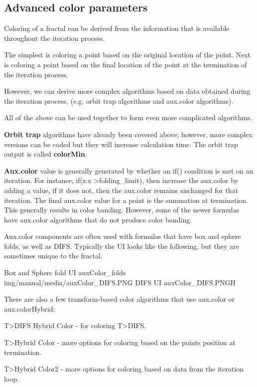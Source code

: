 \subsection{Advanced color parameters}\label{materials-advanced-color-parameters}

Coloring of a fractal can be derived from the information that is available throughout the iteration process.

The simplest is coloring a point based on the original location of the point.
Next is coloring a point based on the final location of the point at the termination of the iteration process.

However, we can derive more complex algorithms based on data obtained during the iteration process, (e.g. orbit trap algorithms and aux.color algorithms).

All of the above can be used together to form even more complicated algorithms.

\textbf{Orbit trap} algorithms have already been covered above; however, more complex versions can be coded but they will increase calculation time. The orbit trap output is called \textbf{colorMin}.

\textbf{Aux.color} value is generally generated by whether an if() condition is met on an iteration. For instance, if(z.x \textgreater\space folding\_limit), then increase the aux.color by adding a value, if it does not, then the aux.color remains unchanged for that iteration. The final aux.color value for a point is the summation at termination. This generally results in color banding. However, some of the newer formulas have aux.color algorithms that do not produce color banding.

Aux.color components are often used with formulas that have box and sphere folds, as well as DIFS. Typically the UI looks like the following, but they are sometimes unique to the fractal.

{Box and Sphere fold UI}
{auxColor_folds}
{img/manual/media/auxColor_DIFS.PNG}
{DIFS UI}
{auxColor_DIFS.PNG}{H}

There are also a few transform-based color algorithms that use aux.color or aux.colorHybrid:

T>DIFS Hybrid Color - for coloring T>DIFS.

T>Hybrid Color - more options for coloring based on the points position at termination.

T>Hybrid Color2 - more options for coloring based on data from the iteration loop.

